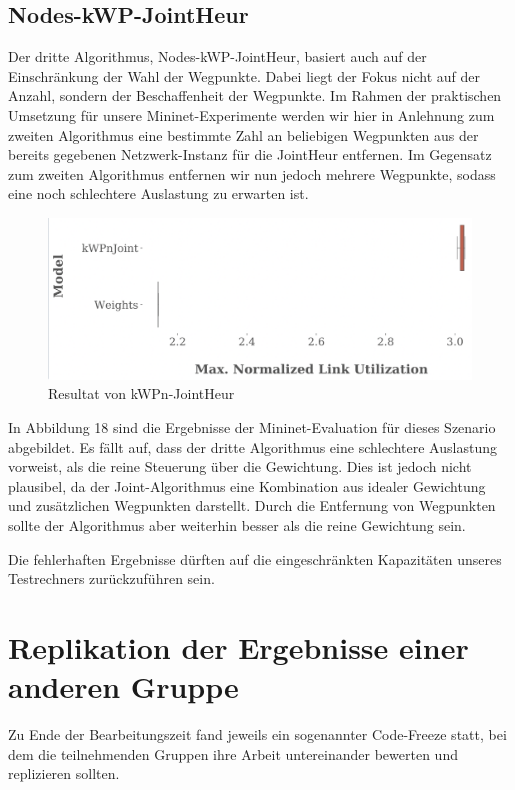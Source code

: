 \documentclass[sigconf,noacm,review]{acmart}
\begin{document}
\subsection{Nodes-kWP-JointHeur}
Der dritte Algorithmus, Nodes-kWP-JointHeur, basiert auch auf der Einschränkung der Wahl der Wegpunkte. Dabei liegt der Fokus nicht auf der Anzahl, sondern der Beschaffenheit der Wegpunkte. Im Rahmen der praktischen Umsetzung für unsere Mininet-Experimente werden wir hier in Anlehnung zum zweiten Algorithmus eine bestimmte Zahl an beliebigen Wegpunkten aus der bereits gegebenen Netzwerk-Instanz für die JointHeur entfernen. Im Gegensatz zum zweiten Algorithmus entfernen wir nun jedoch mehrere Wegpunkte, sodass eine noch schlechtere Auslastung zu erwarten ist.

\begin{figure}[h]
  \centering
  \includegraphics[width=\linewidth]{abbildungen/kWPnJoint.png}
  \caption{Resultat von kWPn-JointHeur}
\end{figure}

In Abbildung 18 sind die Ergebnisse der Mininet-Evaluation für dieses Szenario abgebildet. Es fällt auf, dass der dritte Algorithmus eine schlechtere Auslastung vorweist, als die reine Steuerung über die Gewichtung. Dies ist jedoch nicht plausibel, da der Joint-Algorithmus eine Kombination aus idealer Gewichtung und zusätzlichen Wegpunkten darstellt. Durch die Entfernung von Wegpunkten sollte der Algorithmus aber weiterhin besser als die reine Gewichtung sein.

Die fehlerhaften Ergebnisse dürften auf die eingeschränkten Kapazitäten unseres Testrechners zurückzuführen sein.

\section{Replikation der Ergebnisse einer anderen Gruppe}
Zu Ende der Bearbeitungszeit fand jeweils ein sogenannter Code-Freeze statt, bei dem die teilnehmenden Gruppen ihre Arbeit untereinander bewerten und replizieren sollten. 
\end{document}
